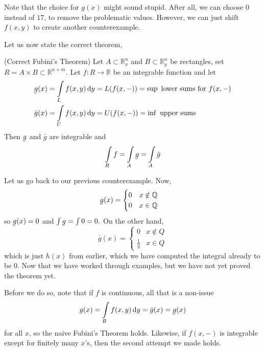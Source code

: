 \documentclass{article}
\newcommand{\ubar}[1]{\underaccent{\bar}{#1}}
\begin{document}
Note that the choice for $g(x)$ might sound stupid. After all, we can choose $0$ instead of $17$, to remove the problematic values. However, we can just shift $f(x,y)$ to create another counterexample.

Let us now state the correct theorem,
\begin{theorem}
    (Correct Fubini's Theorem) Let $A \subset \mathbb{R}_x^n$ and $B \subset \mathbb{R}_y^n$ be rectangles, set $R=A\times B \subset \mathbb{R}^{n+m}$. Let $f:R\rightarrow \mathbb{R}$ be an integrable function and let
    \begin{align}
        \ubar{g}(x) &= \int\limits_L f(x,y) \dd{y} = L(f(x,-)) = \sup \text{ lower sums for } f(x,-)\\ 
        \bar{g}(x) &= \int\limits_U f(x,y) \dd{y} = U(f(x,-)) = \inf \text{ upper sums}
    \end{align}
    Then $\ubar{g}$ and $\bar{g}$ are integrable and 
    \begin{equation}
        \int\limits_R f = \int\limits_A \ubar{g} = \int\limits_A \bar{g}
    \end{equation}
\end{theorem}
Let us go back to our previous counterexample. Now,
\begin{align}
    \ubar{g}(x) &= \begin{cases}
        0 & x\notin \mathbb{Q} \\ 
        0 & x\in \mathbb{Q}
    \end{cases}
\end{align}
so $\ubar{g}(x)=0$ and $\int \ubar{g} = \int 0 = 0.$ On the other hand,
\begin{equation}
    \bar{g}(x) = \begin{cases}
        0 & x\not\in Q \\ 
        \frac{1}{q} & x \in Q
    \end{cases}
\end{equation}
which is just $h(x)$ from earlier, which we have computed the integral already to be $0$. Now that we have worked through examples, but we have not yet proved the theorem yet.

Before we do so, note that if $f$ is continuous, all that is a non-issue
\begin{equation}
    g(x) = \int\limits_B f(x,y) \dd{y} = \bar{g}(x)=\ubar{g}(x)
\end{equation}
for all $x$, so the naive Fubini's Theorem holds. Likewise, if $f(x,-)$ is integrable except for finitely many $x$'s, then the second attempt we made holds.
\end{document}
